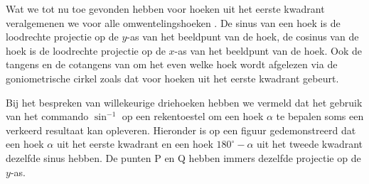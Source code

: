Wat we tot nu toe gevonden hebben voor hoeken uit het eerste kwadrant veralgemenen we voor alle omwentelingshoeken .
De sinus van een hoek is de loodrechte projectie op de $y$-as van het beeldpunt van de hoek, de cosinus van de hoek is de loodrechte projectie op de $x$-as van het beeldpunt van de hoek.
Ook de tangens en de cotangens van om het even welke hoek wordt afgelezen via de goniometrische cirkel zoals dat voor hoeken uit het eerste kwadrant gebeurt.


\begin{opmerking}
	 Bij het bespreken van willekeurige driehoeken hebben we vermeld dat het gebruik van het commando $\sin^{-1}$ op een rekentoestel om een hoek $\alpha$ te bepalen soms een verkeerd resultaat kan opleveren. Hieronder is op een figuur gedemonstreerd dat een hoek $\alpha$ uit het eerste kwadrant en een hoek $180^\circ -\alpha$ uit het tweede kwadrant dezelfde sinus hebben. De punten P en Q hebben immers dezelfde projectie op de $y$-as.
\end{opmerking}

\begin{figure}[H]
	\centering
	
\end{figure}



